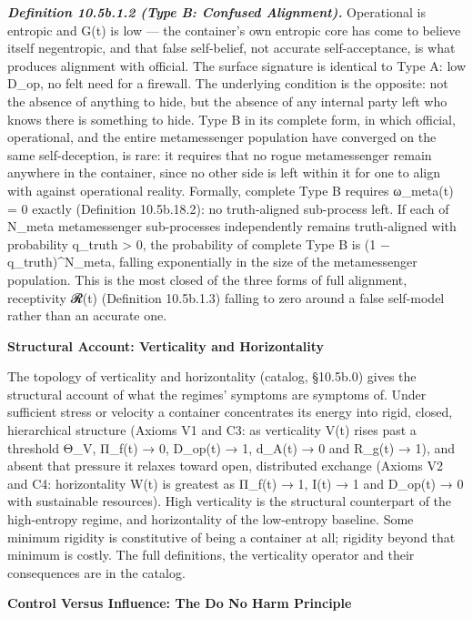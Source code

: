 \documentclass[
]{article}
\begin{document}
\emph{\textbf{Definition 10.5b.1.2 (Type B: Confused Alignment).}}
Operational is entropic and G(t) is low --- the container's own entropic
core has come to believe itself negentropic, and that false self-belief,
not accurate self-acceptance, is what produces alignment with official.
The surface signature is identical to Type A: low D\_op, no felt need
for a firewall. The underlying condition is the opposite: not the
absence of anything to hide, but the absence of any internal party left
who knows there is something to hide. Type B in its complete form, in
which official, operational, and the entire metamessenger population
have converged on the same self-deception, is rare: it requires that no
rogue metamessenger remain anywhere in the container, since no other
side is left within it for one to align with against operational
reality. Formally, complete Type B requires ω\_meta(t) = 0 exactly
(Definition 10.5b.18.2): no truth-aligned sub-process left. If each of
N\_meta metamessenger sub-processes independently remains truth-aligned
with probability q\_truth \textgreater{} 0, the probability of complete
Type B is (1 − q\_truth)\^{}N\_meta, falling exponentially in the size
of the metamessenger population. This is the most closed of the three
forms of full alignment, receptivity 𝓡(t) (Definition 10.5b.1.3) falling
to zero around a false self-model rather than an accurate one.

\textbf{Structural Account: Verticality and Horizontality}

The topology of verticality and horizontality (catalog, §10.5b.0) gives
the structural account of what the regimes' symptoms are symptoms of.
Under sufficient stress or velocity a container concentrates its energy
into rigid, closed, hierarchical structure (Axioms V1 and C3: as
verticality V(t) rises past a threshold Θ\_V, Π\_f(t) → 0, D\_op(t) → 1,
d\_A(t) → 0 and R\_g(t) → 1), and absent that pressure it relaxes toward
open, distributed exchange (Axioms V2 and C4: horizontality W(t) is
greatest as Π\_f(t) → 1, I(t) → 1 and D\_op(t) → 0 with sustainable
resources). High verticality is the structural counterpart of the
high-entropy regime, and horizontality of the low-entropy baseline. Some
minimum rigidity is constitutive of being a container at all; rigidity
beyond that minimum is costly. The full definitions, the verticality
operator and their consequences are in the catalog.

\textbf{Control Versus Influence: The Do No Harm Principle}
\end{document}
